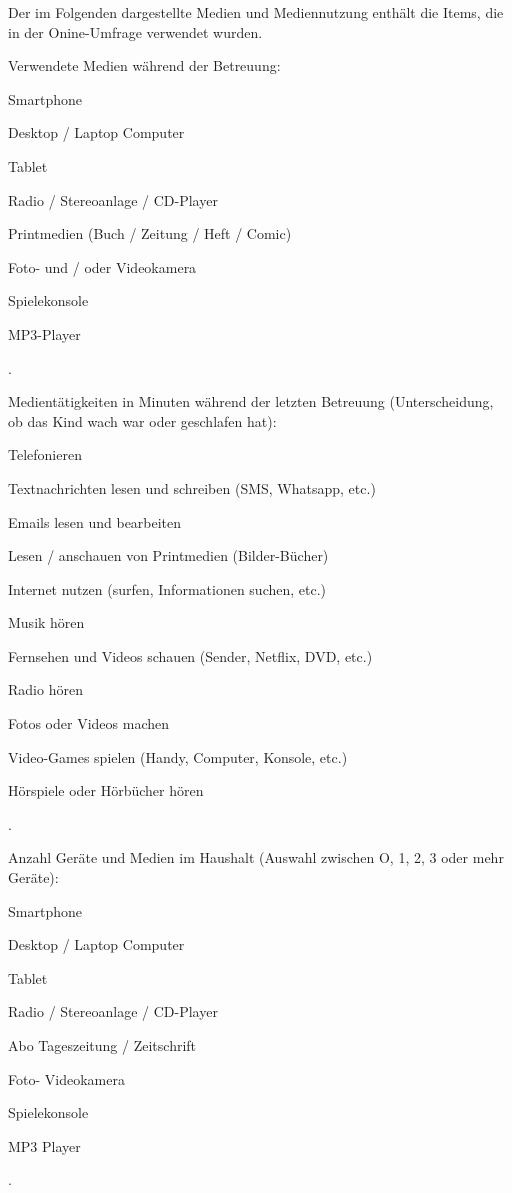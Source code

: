 Der im Folgenden dargestellte Medien und Mediennutzung enthält die Items, die in der Onine-Umfrage verwendet wurden. 

Verwendete Medien während der Betreuung: \begin{seriate}
  \item Smartphone
  \item Desktop / Laptop Computer
  \item Tablet
  \item Radio / Stereoanlage / CD-Player
  \item Printmedien (Buch / Zeitung / Heft / Comic)
  \item Foto- und / oder Videokamera
  \item Spielekonsole
  \item MP3-Player
\end{seriate}.

Medientätigkeiten in Minuten während der letzten Betreuung (Unterscheidung, ob das Kind wach war oder geschlafen hat):
\begin{seriate}
  \item Telefonieren
  \item Textnachrichten lesen und schreiben (SMS, Whatsapp, etc.)
  \item Emails lesen und bearbeiten
  \item Lesen / anschauen von Printmedien (Bilder-Bücher)
  \item Internet nutzen (surfen, Informationen suchen, etc.)
  \item Musik hören
  \item Fernsehen und Videos schauen (Sender, Netflix, DVD, etc.)
  \item Radio hören
  \item Fotos oder Videos machen
  \item Video-Games spielen (Handy, Computer, Konsole, etc.)
  \item Hörspiele oder Hörbücher hören
\end{seriate}.

Anzahl Geräte und Medien im Haushalt (Auswahl zwischen O, 1, 2, 3 oder mehr Geräte):
\begin{seriate}
  \item Smartphone
  \item Desktop / Laptop Computer
  \item Tablet
  \item Radio / Stereoanlage / CD-Player
  \item Abo Tageszeitung / Zeitschrift
  \item Foto- Videokamera
  \item Spielekonsole
  \item MP3 Player
\end{seriate}.


